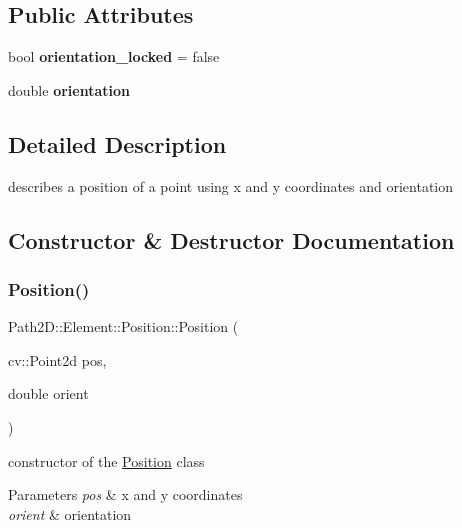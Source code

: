 \subsection*{Public Attributes}
\begin{DoxyCompactItemize}
\item 
\mbox{\label{class_path2_d_1_1_element_1_1_position_ab6dd50c899b47e8122ee9e6b89a8e9cf}} 
bool {\bfseries orientation\+\_\+locked} = false
\item 
\mbox{\label{class_path2_d_1_1_element_1_1_position_a1261c86b73661feef55e185e533ded5d}} 
double {\bfseries orientation}
\end{DoxyCompactItemize}


\subsection{Detailed Description}
describes a position of a point using x and y coordinates and orientation 

\subsection{Constructor \& Destructor Documentation}
\mbox{\label{class_path2_d_1_1_element_1_1_position_ad8dafce9ad9442b93ebdb0d991f3b945}} 
\subsubsection{\texorpdfstring{Position()}{Position()}}
{\footnotesize\ttfamily Path2\+D\+::\+Element\+::\+Position\+::\+Position (\begin{DoxyParamCaption}\item[{cv\+::\+Point2d}]{pos,  }\item[{double}]{orient }\end{DoxyParamCaption})}



constructor of the \mbox{\hyperlink{class_path2_d_1_1_element_1_1_position}{Position}} class 


\begin{DoxyParams}{Parameters}
{\em pos} & x and y coordinates \\
\hline
{\em orient} & orientation \\
\hline
\end{DoxyParams}


